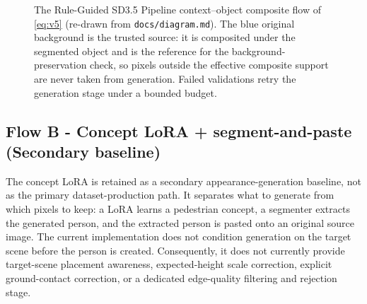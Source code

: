 \documentclass[11pt,a4paper]{article}
\newcommand{\rgp}{Rule-Guided SD3.5 Pipeline\xspace}  %
\begin{document}
\begin{figure}[H]
  \centering
  \caption[Rule-Guided SD3.5 Pipeline architecture]{The \rgp context--object composite
  flow of \cref{eq:v5} (re-drawn from \texttt{docs/diagram.md}). The blue
  original background is the trusted source: it is composited under the
  segmented object and is the reference for the background-preservation check, so
  pixels outside the effective composite support are never taken from generation.
  Failed validations retry the generation stage under a bounded budget.}
  \label{fig:v5arch}
\end{figure}

\subsection{Flow B - Concept LoRA + segment-and-paste (Secondary baseline)}\label{sec:lora}
The concept LoRA is retained as a secondary appearance-generation baseline, not as the primary dataset-production path. It separates what to generate from which pixels to keep: a LoRA learns a pedestrian concept, a segmenter extracts the generated person, and the extracted person is pasted onto an original source image. The current implementation does not condition generation on the target scene before the person is created. Consequently, it does not currently provide target-scene placement awareness, expected-height scale correction, explicit ground-contact correction, or a dedicated edge-quality filtering and rejection stage.
\end{document}
